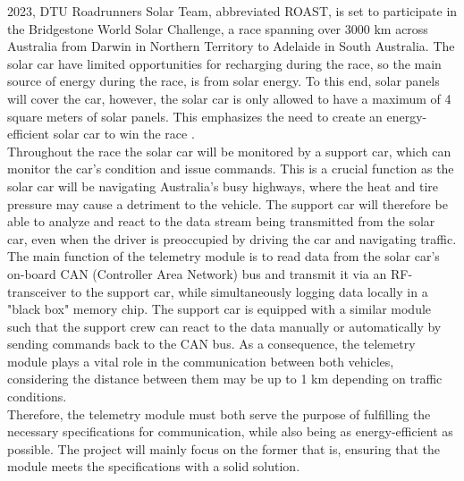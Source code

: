 \documentclass[conference]{IEEEtran}
\begin{document}
 2023, DTU Roadrunners Solar Team, abbreviated ROAST, is set to participate in the Bridgestone World Solar Challenge, a race spanning over 3000 km across Australia from Darwin in Northern Territory to Adelaide in South Australia. The solar car have limited opportunities for recharging during the race, so the main source of energy during the race, is from solar energy. To this end, solar panels will cover the car, however, the solar car is only allowed to have a maximum of 4 square meters of solar panels. This emphasizes the need to create an energy-efficient solar car to win the race \cite{wsc}.\\
Throughout the race the solar car will be monitored by a support car, which can monitor the car's condition and issue commands. This is a crucial function as the solar car will be navigating Australia's busy highways, where the heat and tire pressure may cause a detriment to the vehicle. The support car will therefore be able to analyze and react to the data stream being transmitted from the solar car, even when the driver is preoccupied by driving the car and navigating traffic. \\
The main function of the telemetry module is to read data from the solar car's on-board CAN (Controller Area Network) bus and transmit it via an RF-transceiver to the support car, while simultaneously logging data locally in a "black box" memory chip. The support car is equipped with a similar module such that the support crew can react to the data manually or automatically by sending commands back to the CAN bus. As a consequence, the telemetry module plays a vital role in the communication between both vehicles, considering the distance between them may be up to 1 km depending on traffic conditions.\\
Therefore, the telemetry module must both serve the purpose of fulfilling the necessary specifications for communication, while also being as energy-efficient as possible. The project will mainly focus on the former that is, ensuring that the module meets the specifications with a solid solution.
\end{document}
